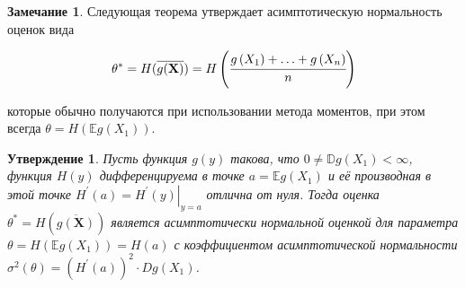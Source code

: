 \documentclass[oneside,final,14pt]{extreport}
\theoremstyle{plain}
\newtheorem*{thm*}{Утверждение}
\theoremstyle{definition}
\newtheorem*{rmrk}{Замечание}
\theoremstyle{named}
\begin{document}
\begin{rmrk}
Следующая теорема утверждает асимптотическую нормальность оценок вида

\begin{equation*}
    \theta^{*}=H(\overline{g(\mathbf{X})})=H\left(\cfrac{g\left(X_{1}\right)+\ldots+g\left(X_{n}\right)}{n}\right)
\end{equation*}

которые обычно получаются при использовании метода моментов, при этом всегда $\theta=H\left(\mathbb{E} g\left(X_{1}\right)\right)$.
\end{rmrk}

\begin{thm*}
Пусть функция $g(y)$ такова, что $0 \neq \mathbb{D} g\left(X_{1}\right)<\infty$, функция $H(y)$ дифференцируема в точке $a=\mathbb{E} g\left(X_{1}\right)$ и её производная в этой точке $H^{\prime}(a)=\left.H^{\prime}(y)\right|_{y=a}$ отлична от нуля. Тогда оценка $\theta^{*}=H(\overline{g(\mathbf{X})})$
является асимптотически нормальной
оценкой для параметра $\theta=H\left(\mathbb{E} g\left(X_{1}\right)\right)=H(a)$ с коэффициентом асимптотической нормальности $\sigma^{2}(\theta)=\left(H^{\prime}(a)\right)^{2} \cdot D g\left(X_{1}\right)$.
\end{thm*}
\end{document}
